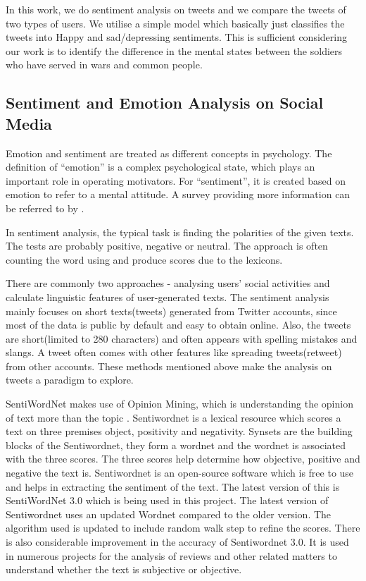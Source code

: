 In this work, we do sentiment analysis on tweets and we compare the tweets of
two types of users. We utilise a simple model which basically just classifies
the tweets into Happy and sad/depressing sentiments. This is sufficient
considering our work is to identify the difference in the mental states between
the soldiers who have served in wars and common people.

\subsection{Sentiment and Emotion Analysis on Social Media}

Emotion and sentiment are treated as different concepts in psychology. The
definition of \enquote{emotion} is a complex psychological state, which plays an
important role in operating motivators. For \enquote{sentiment}, it is created based on
emotion to refer to a mental attitude. A survey providing more information can
be referred to by \citep{yue2018survey}.

In sentiment analysis, the typical task is finding the polarities of the given
texts. The tests are probably positive, negative or neutral. The approach is
often counting the word using and produce scores due to the lexicons.

There are commonly two approaches - analysing users' social activities and calculate linguistic features of user-generated texts. The sentiment analysis mainly focuses on short texts(tweets) generated from Twitter accounts, since most of the data is public by default and easy to obtain online. Also, the tweets are short(limited to 280 characters) and often appears with spelling mistakes and slangs. A tweet often comes with other features like spreading tweets(retweet) from other accounts. These methods mentioned above make the analysis on tweets a paradigm to explore.

SentiWordNet makes use of Opinion Mining, which is understanding the opinion of text more than the topic \citep{esuli2006sentiwordnet}. Sentiwordnet is a lexical resource which scores a text on three premises object, positivity and negativity. Synsets are the building blocks of the Sentiwordnet, they form a wordnet and the wordnet is associated with the three scores. The three scores help determine how objective, positive and negative the text is. Sentiwordnet is an open-source software which is free to use and helps in extracting the sentiment of the text. The latest version of this is SentiWordNet 3.0 \citep{baccianella2010sentiwordnet} which is being used in this project. The latest version of Sentiwordnet uses an updated Wordnet compared to the older version. The algorithm used is updated to include random walk step to refine the scores. There is also considerable improvement in the accuracy of Sentiwordnet 3.0. It is used in numerous projects for the analysis of reviews and other related matters to understand whether the text is subjective or objective.

